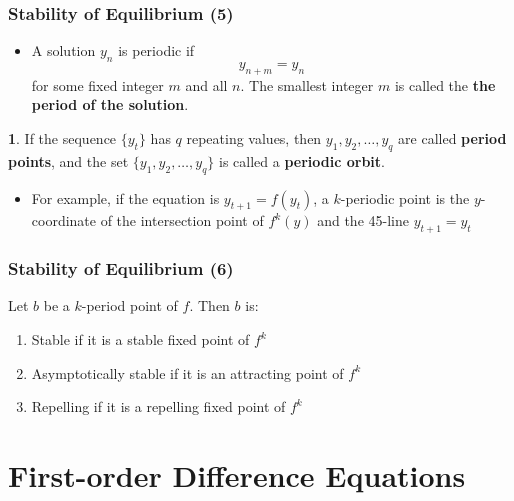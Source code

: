 \documentclass[10pt,usenames,dvipsnames]{beamer}
\theoremstyle{plain}
\theoremstyle{definition}
\newtheorem{defn}{\translate{Definition}}
\begin{document}
\begin{frame}[fragile]
\frametitle{Stability of Equilibrium (5)}
\begin{itemize}
	\item A solution $y_{n}$ is periodic if 
	\[
		y_{n+m} = y_{n}
	\]
	for some fixed integer $m$ and all $n$. The smallest integer $m$ is called the \textbf{the period of the solution}.
\end{itemize}
\begin{defn}
	If the sequence $\{y_{t}\}$ has $q$ repeating values, then $y_{1}, y_{2},\ldots, y_{q}$ are called \textbf{period points}, and the set $\{y_{1},y_{2},\ldots,y_{q}\}$ is called a \textbf{periodic orbit}.
\end{defn}

\begin{itemize}
	\item For example, if the equation is $y_{t+1} = f(y_{t})$, a $k$-periodic point is the $y$-coordinate of the intersection point of $f^{k}(y)$ and the 45\degree-line $y_{t+1} = y_{t}$
\end{itemize}

\end{frame}

\begin{frame}[fragile]
\frametitle{Stability of Equilibrium (6)}
\begin{theorem}
	Let $b$ be a $k$-period point of $f$. Then $b$ is:
	\begin{enumerate}
		\item Stable if it is a stable fixed point of $f^{k}$
		\item Asymptotically stable if it is an attracting point of $f^{k}$
		\item Repelling if it is a repelling fixed point of $f^{k}$
	\end{enumerate}
\end{theorem}
\end{frame}


\section{First-order Difference Equations}
\end{document}
